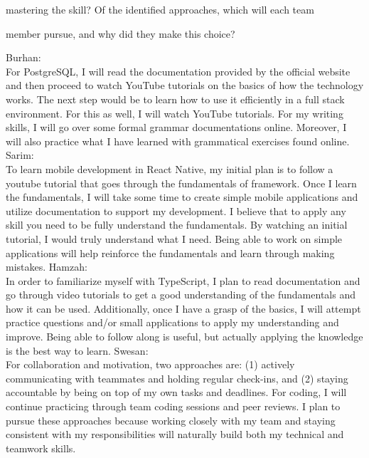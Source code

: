 \documentclass[12pt,letterpaper]{article}
\begin{document}
\begin{enumerate}
  mastering the skill?  Of the identified approaches, which will each team 

  member pursue, and why did they make this choice? \\
  \vspace{1em}

Burhan:  \\

For PostgreSQL, I will read the documentation provided by the official website and then proceed to watch YouTube tutorials on the basics of how the technology works. The next step would be to learn how to use it efficiently in a full stack environment. For this as well, I will watch YouTube tutorials. For my writing skills, I will go over some formal grammar documentations online. Moreover, I will also practice what I have learned with grammatical exercises found online.  
\vspace{1em}
Sarim: \\
To learn mobile development in React Native, my initial plan is to follow a youtube tutorial that goes through the fundamentals of framework. Once I learn the fundamentals, I will take some time to create simple mobile applications and utilize documentation to support my development. I believe that to apply any skill you need to be fully understand the fundamentals. By watching an initial tutorial, I would truly understand what I need. Being able to work on simple applications will help reinforce the fundamentals and learn through making mistakes.
\vspace{1em}
Hamzah: \\

In order to familiarize myself with TypeScript, I plan to read documentation and go through video tutorials to get a good understanding of the fundamentals and how it can be used. Additionally, once I have a grasp of the basics, I will attempt practice questions and/or small applications to apply my understanding and improve. Being able to follow along is useful, but actually applying the knowledge is the best way to learn. 
\vspace{1em}
Swesan: \\
For collaboration and motivation, two approaches are: (1) actively communicating with teammates and holding regular check-ins, and (2) staying accountable by being on top of my own tasks and deadlines. For coding, I will continue practicing through team coding sessions and peer reviews. I plan to pursue these approaches because working closely with my team and staying consistent with my responsibilities will naturally build both my technical and teamwork skills. 

\end{enumerate}


\nocite{Kebirungi2024,ChandaAndSo2025,PIPEDA2000,OntarioHTA1990,TSLintStandard2024,PrettierStandard2024,PCIDSS401,WCAG22}

\end{document}
